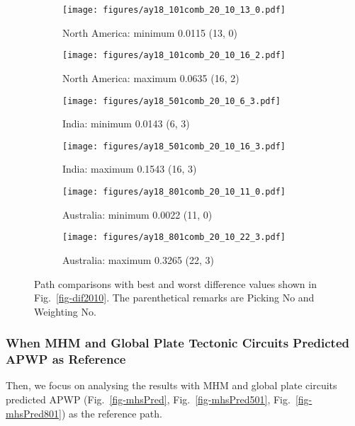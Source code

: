 \begin{figure*}
	\centering
	\begin{subfigure}{.43\textwidth}
		\texttt{[image: figures/ay18\_101comb\_20\_10\_13\_0.pdf]}
		\caption{North America: minimum 0.0115 (13, 0)}\label{fig-nac-2010130}
	\end{subfigure}
	\begin{subfigure}{.43\textwidth}
		\texttt{[image: figures/ay18\_101comb\_20\_10\_16\_2.pdf]}
		\caption{North America: maximum 0.0635 (16, 2)}\label{fig-nac-2010162}
	\end{subfigure}
	\vspace{.1em}
	\begin{subfigure}{.43\textwidth}
		\texttt{[image: figures/ay18\_501comb\_20\_10\_6\_3.pdf]}
		\caption{India: minimum 0.0143 (6, 3)}\label{fig-ind-201063}
	\end{subfigure}
	\begin{subfigure}{.43\textwidth}
		\texttt{[image: figures/ay18\_501comb\_20\_10\_16\_3.pdf]}
		\caption{India: maximum 0.1543 (16, 3)}\label{fig-ind-2010163}
	\end{subfigure}
	\vspace{.1em}
	\begin{subfigure}{.43\textwidth}
		\texttt{[image: figures/ay18\_801comb\_20\_10\_11\_0.pdf]}
		\caption{Australia: minimum 0.0022 (11, 0)}\label{fig-au-2010110}
	\end{subfigure}
	\begin{subfigure}{.43\textwidth}
		\texttt{[image: figures/ay18\_801comb\_20\_10\_22\_3.pdf]}
		\caption{Australia: maximum 0.3265 (22, 3)}\label{fig-au-2010223}
	\end{subfigure}
	\caption[Best and worst differences (20 Myr bin, 10 Myr
step)]{Path comparisons with best and worst difference values shown in
Fig.~\ref{fig-dif2010}. The parenthetical remarks are Picking No and Weighting No.}\label{fig-dif2010bw}
\end{figure*}


\subsubsection{When MHM and Global Plate Tectonic Circuits Predicted APWP as
Reference}

Then, we focus on analysing the results with MHM and global plate circuits
predicted APWP (Fig.~\ref{fig-mhsPred}, Fig.~\ref{fig-mhsPred501},
Fig.~\ref{fig-mhsPred801}) as the reference path.

